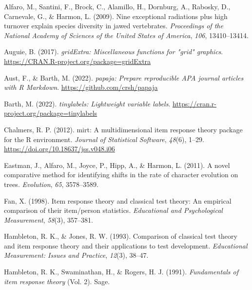 \documentclass[
  man]{apa6}
\newlength{\cslhangindent}
\newlength{\cslentryspacingunit} %
\newenvironment{CSLReferences}[2] %
 {%
  \setlength{\parindent}{0pt}
  \ifodd #1
  \let\oldpar\par
  \def\par{\hangindent=\cslhangindent\oldpar}
  \fi
  \setlength{\parskip}{#2\cslentryspacingunit}
 }%
 {}
\begin{document}
\hypertarget{refs}{}
\begin{CSLReferences}{1}{0}
\leavevmode{}%
Alfaro, M., Santini, F., Brock, C., Alamillo, H., Dornburg, A., Rabosky, D., Carnevale, G., \& Harmon, L. (2009). Nine exceptional radiations plus high turnover explain species diversity in jawed vertebrates. \emph{Proceedings of the National Academy of Sciences of the United States of America}, \emph{106}, 13410--13414.

\leavevmode{}%
Auguie, B. (2017). \emph{gridExtra: Miscellaneous functions for "grid" graphics}. \url{https://CRAN.R-project.org/package=gridExtra}

\leavevmode{}%
Aust, F., \& Barth, M. (2022). \emph{{papaja}: {Prepare} reproducible {APA} journal articles with {R Markdown}}. \url{https://github.com/crsh/papaja}

\leavevmode{}%
Barth, M. (2022). \emph{{tinylabels}: Lightweight variable labels}. \url{https://cran.r-project.org/package=tinylabels}

\leavevmode{}%
Chalmers, R. P. (2012). {mirt}: A multidimensional item response theory package for the {R} environment. \emph{Journal of Statistical Software}, \emph{48}(6), 1--29. \url{https://doi.org/10.18637/jss.v048.i06}

\leavevmode{}%
Eastman, J., Alfaro, M., Joyce, P., Hipp, A., \& Harmon, L. (2011). A novel comparative method for identifying shifts in the rate of character evolution on trees. \emph{Evolution}, \emph{65}, 3578--3589.

\leavevmode{}%
Fan, X. (1998). Item response theory and classical test theory: An empirical comparison of their item/person statistics. \emph{Educational and Psychological Measurement}, \emph{58}(3), 357--381.

\leavevmode{}%
Hambleton, R. K., \& Jones, R. W. (1993). Comparison of classical test theory and item response theory and their applications to test development. \emph{Educational Measurement: Issues and Practice}, \emph{12}(3), 38--47.

\leavevmode{}%
Hambleton, R. K., Swaminathan, H., \& Rogers, H. J. (1991). \emph{Fundamentals of item response theory} (Vol. 2). Sage.


\end{CSLReferences}
\end{document}
